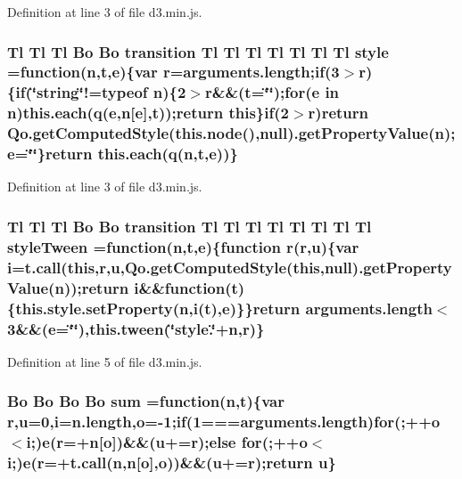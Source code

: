 Definition at line 3 of file d3.\+min.\+js.

\subsubsection[{style}]{ {\bf Tl} {\bf Tl} {\bf Tl} {\bf Bo} {\bf Bo} {\bf transition} {\bf Tl} {\bf Tl} {\bf Tl} {\bf Tl} {\bf Tl} {\bf Tl} {\bf Tl} style =function({\bf n},t,{\bf e})\{var {\bf r}=arguments.\+length;{\bf if}(3$>${\bf r})\{{\bf if}(\char`\"{}string\char`\"{}!=typeof {\bf n})\{2$>${\bf r}\&\&(t=\char`\"{}\char`\"{});{\bf for}({\bf e} in {\bf n}){\bf this.\+each}(q({\bf e},{\bf n}[{\bf e}],t));{\bf return} {\bf this}\}{\bf if}(2$>${\bf r}){\bf return} Qo.\+get\+Computed\+Style({\bf this.\+node}(),null).get\+Property\+Value({\bf n});{\bf e}=\char`\"{}\char`\"{}\}{\bf return} {\bf this.\+each}(q({\bf n},t,{\bf e}))\}}\label{d3_8min_8js_a2d062e13705abf1e2fc32d6b5e38b830}


Definition at line 3 of file d3.\+min.\+js.

\subsubsection[{style\+Tween}]{ {\bf Tl} {\bf Tl} {\bf Tl} {\bf Bo} {\bf Bo} {\bf transition} {\bf Tl} {\bf Tl} {\bf Tl} {\bf Tl} {\bf Tl} {\bf Tl} {\bf Tl} {\bf Tl} style\+Tween =function({\bf n},t,{\bf e})\{function {\bf r}({\bf r},u)\{var {\bf i}={\bf t.\+call}({\bf this},{\bf r},u,Qo.\+get\+Computed\+Style({\bf this},null).get\+Property\+Value({\bf n}));{\bf return} {\bf i}\&\&function(t)\{this.\+style.\+set\+Property({\bf n},{\bf i}(t),{\bf e})\}\}{\bf return} arguments.\+length$<$3\&\&({\bf e}=\char`\"{}\char`\"{}),{\bf this.\+tween}(\char`\"{}style.\char`\"{}+n,{\bf r})\}}\label{d3_8min_8js_a7ac2665b95bde78804357cdb04830335}


Definition at line 5 of file d3.\+min.\+js.

\subsubsection[{sum}]{ {\bf Bo} {\bf Bo} {\bf Bo} {\bf Bo} sum =function({\bf n},t)\{var {\bf r},u=0,{\bf i}=n.\+length,{\bf o}=-\/1;{\bf if}(1===arguments.\+length){\bf for}(;++{\bf o}$<${\bf i};){\bf e}({\bf r}=+{\bf n}[{\bf o}])\&\&(u+={\bf r});{\bf else} {\bf for}(;++{\bf o}$<${\bf i};){\bf e}({\bf r}=+{\bf t.\+call}({\bf n},{\bf n}[{\bf o}],{\bf o}))\&\&(u+={\bf r});{\bf return} u\}}\label{d3_8min_8js_aa0b87880949a88d82f5e1b68a0b8b1c4}



